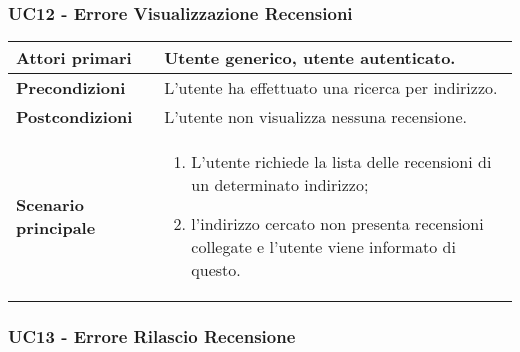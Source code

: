         \subsubsection{UC12 - Errore Visualizzazione Recensioni}
        \label{UC12}

            \begin{center}
                \renewcommand{\arraystretch}{1.5}
                \begin{tabular}{m{10em} m{20em}}
                    \hline
                    \textbf{Attori primari} & Utente generico, utente autenticato. \\
                    \hline
                    \textbf{Precondizioni} & L'utente ha effettuato una ricerca per indirizzo. \\
                    \hline
                    \textbf{Postcondizioni} & L'utente non visualizza nessuna recensione. \\
                    \hline
                    \textbf{Scenario principale} &
                        \begin{enumerate}
                            \item L'utente richiede la lista delle recensioni di un determinato indirizzo;
                            \item l'indirizzo cercato non presenta recensioni collegate e l'utente viene
                            informato di questo.
                        \end{enumerate} \\
                    \hline
                \end{tabular}
            \end{center}

        \subsubsection{UC13 - Errore Rilascio Recensione}
        \label{UC13}

